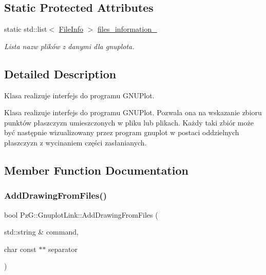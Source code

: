 \subsection*{Static Protected Attributes}
\begin{DoxyCompactItemize}
\item 
static std\+::list$<$ \hyperlink{class_pz_g_1_1_file_info}{File\+Info} $>$ \hyperlink{class_pz_g_1_1_gnuplot_link_af4b03524d7d1ccb3f09524217048ef5d}{files\+\_\+information\+\_\+}
\begin{DoxyCompactList}\small\item\em Lista nazw plików z danymi dla {\itshape gnuplota}. \end{DoxyCompactList}\end{DoxyCompactItemize}


\subsection{Detailed Description}
Klasa realizuje interfejs do programu G\+N\+U\+Plot. 

Klasa realizuje interfejs do programu G\+N\+U\+Plot. Pozwala ona na wskazanie zbioru punktów płaszczyzn umieszczonych w pliku lub plikach. Każdy taki zbiór może być następnie wizualizowany przez program gnuplot w postaci oddzielnych płaszczyzn z wycinaniem części zasłanianych. 

\subsection{Member Function Documentation}
\mbox{\label{class_pz_g_1_1_gnuplot_link_a8f6eb81e4b1324d338a13de9fe692583}} 
\subsubsection{\texorpdfstring{Add\+Drawing\+From\+Files()}{AddDrawingFromFiles()}}
{\footnotesize\ttfamily bool Pz\+G\+::\+Gnuplot\+Link\+::\+Add\+Drawing\+From\+Files (\begin{DoxyParamCaption}\item[{std\+::string \&}]{command,  }\item[{char const $\ast$$\ast$}]{separator }\end{DoxyParamCaption})}



